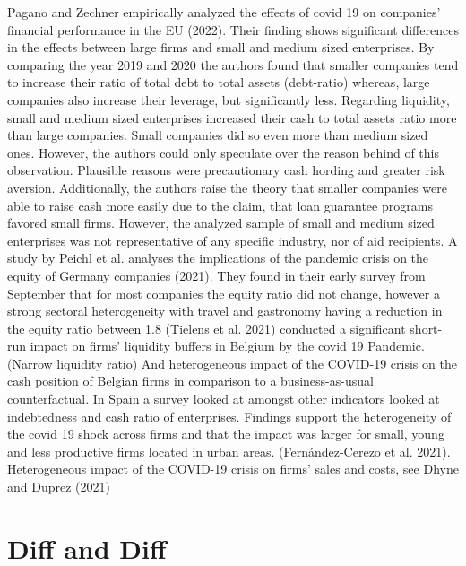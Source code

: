 Pagano and Zechner empirically analyzed the effects of covid 19 on companies’ financial performance in the EU (2022). Their finding shows significant differences in the effects between large firms and small and medium sized enterprises. 
By comparing the year 2019 and 2020 the authors found that smaller companies tend to increase their ratio of total debt to total assets (debt-ratio) whereas, large companies also increase their leverage, but significantly less.
Regarding liquidity, small and medium sized enterprises increased their cash to total assets ratio more than large companies. Small companies did so even more than medium sized ones. However, the authors could only speculate over the reason behind of this observation. Plausible reasons were precautionary cash hording and greater risk aversion. Additionally, the authors raise the theory that smaller companies were able to raise cash more easily due to the claim, that loan guarantee programs favored small firms. However, the analyzed sample of small and medium sized enterprises was not representative of any specific industry, nor of aid recipients. 
A study by Peichl et al. analyses the implications of the pandemic crisis on the equity of Germany companies (2021). They found in their early survey from September that for most companies the equity ratio did not change, however a strong sectoral heterogeneity with travel and gastronomy having a reduction in the equity ratio between 1.8 %
(Tielens et al. 2021) conducted a significant short-run impact on firms’ liquidity buffers in Belgium by the covid 19 Pandemic. (Narrow liquidity ratio) And heterogeneous impact of the COVID-19 crisis on the cash position of Belgian firms in comparison to a business-as-usual counterfactual.
In Spain a survey looked at amongst other indicators looked at indebtedness and cash ratio of enterprises. Findings support the heterogeneity of the covid 19 shock across firms and that the impact was larger for small, young and less productive firms located in urban areas. (Fernández-Cerezo et al. 2021).
Heterogeneous impact of the COVID-19 crisis on firms’ sales and costs, see Dhyne and Duprez (2021)





\section{Diff and Diff}

